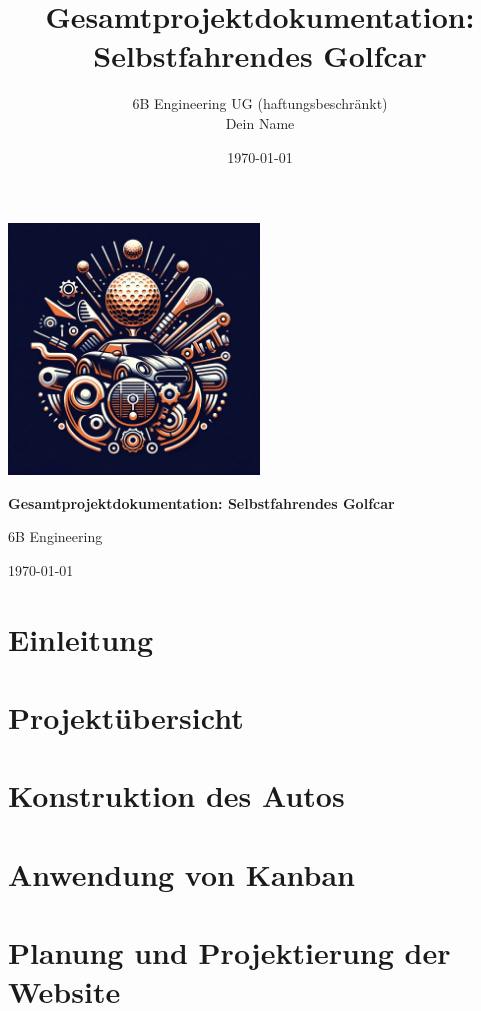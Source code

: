 \documentclass[12pt,a4paper]{article}
\title{Gesamtprojektdokumentation: Selbstfahrendes Golfcar}
\author{6B Engineering UG (haftungsbeschränkt)\\Dein Name}
\date{\today}
\begin{document}
\begin{titlepage}
    \centering
    \vspace*{1cm}
    \includegraphics[width=0.5\textwidth]{Resources/company_logo.jpg}\par\vspace{1cm}
    {\LARGE\bfseries Gesamtprojektdokumentation: Selbstfahrendes Golfcar \par}
    \vspace{1.5cm}
    {\Large 6B Engineering\par}
    \vspace{1cm}
    {\large \today \par}
    \vfill
\end{titlepage}

\newpage
\tableofcontents

\newpage
\section{Einleitung}


\section{Projektübersicht}


\section{Konstruktion des Autos}


\section{Anwendung von Kanban}


\section{Planung und Projektierung der Website}

\end{document}
